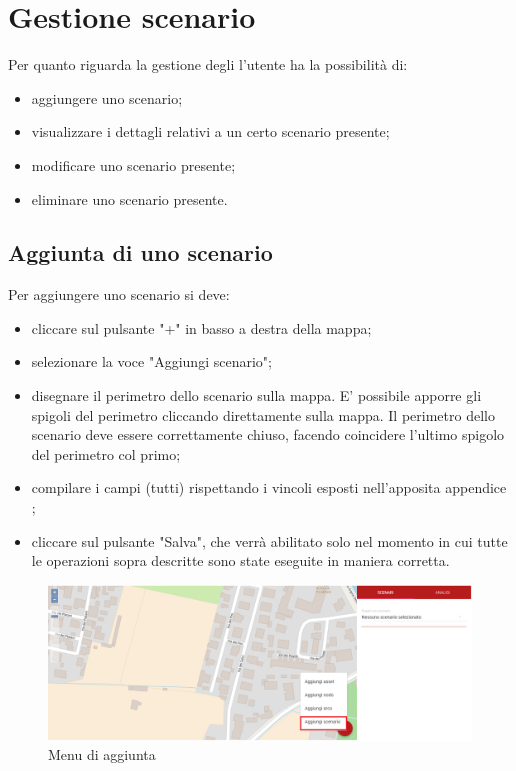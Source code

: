 \section{Gestione scenario}
	Per quanto riguarda la gestione degli  l'utente ha la possibilità di:
	\begin{itemize}
		\item aggiungere uno scenario;
		\item visualizzare i dettagli relativi a un certo scenario presente;
		\item modificare uno scenario presente;
		\item eliminare uno scenario presente.
	\end{itemize}

\subsection{Aggiunta di uno scenario}
	Per aggiungere uno scenario si deve:
	\begin{itemize}
		\item cliccare sul pulsante "+" in basso a destra della mappa;
		\item selezionare la voce "Aggiungi scenario";
		\item disegnare il perimetro dello scenario sulla mappa. E' possibile apporre gli spigoli del perimetro cliccando direttamente sulla mappa. Il perimetro dello scenario deve essere correttamente chiuso, facendo coincidere l'ultimo spigolo del perimetro col primo;
		\item compilare i campi (tutti) rispettando i vincoli esposti nell'apposita appendice ;
		\item cliccare sul pulsante "Salva", che verrà abilitato solo nel momento in cui tutte le operazioni sopra descritte sono state eseguite in maniera corretta.
	\end{itemize}
	
	\begin{figure}[H]
	\centering
	\includegraphics[width=\textwidth]{img/menu_aperto_scenario_hover.png}
	\caption{Menu di aggiunta}
	\end{figure}
	
